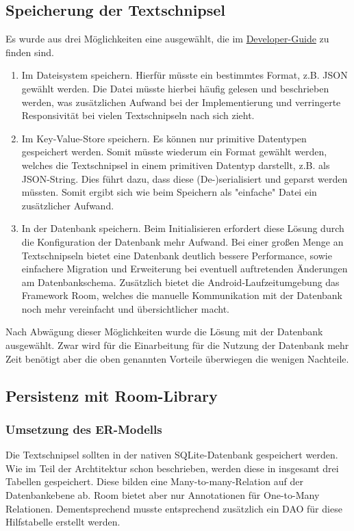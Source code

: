 \documentclass[11pt]{article}
\begin{document}
	\subsection{Speicherung der Textschnipsel}
	Es wurde aus drei Möglichkeiten eine ausgewählt, die im \href{https://developer.android.com/guide/topics/data/data-storage}{Developer-Guide} zu finden sind.
	\begin{enumerate}
		\item Im Dateisystem speichern. Hierfür müsste ein bestimmtes Format, z.B. JSON gewählt werden. Die Datei müsste hierbei häufig gelesen und beschrieben werden, was zusätzlichen Aufwand bei der Implementierung und verringerte Responsivität bei vielen Textschnipseln nach sich zieht.
		\item Im Key-Value-Store speichern. Es können nur primitive Datentypen gespeichert werden. Somit müsste wiederum ein Format gewählt werden, welches die Textschnipsel in einem primitiven Datentyp darstellt, z.B. als JSON-String. Dies führt dazu, dass diese (De-)serialisiert und geparst werden müssten. Somit ergibt sich wie beim Speichern als "einfache" Datei ein zusätzlicher Aufwand.
		\item In der Datenbank speichern. Beim Initialisieren erfordert diese Lösung durch die Konfiguration der Datenbank mehr Aufwand. Bei einer großen Menge an Textschnipseln bietet eine Datenbank deutlich bessere Performance, sowie einfachere Migration und Erweiterung bei eventuell auftretenden Änderungen am Datenbankschema. Zusätzlich bietet die Android-Laufzeitumgebung das Framework Room, welches die manuelle Kommunikation mit der Datenbank noch mehr vereinfacht und übersichtlicher macht.
	\end{enumerate}
	Nach Abwägung dieser Möglichkeiten wurde die Lösung mit der Datenbank ausgewählt. Zwar wird für die Einarbeitung für die Nutzung der Datenbank mehr Zeit benötigt aber die oben genannten Vorteile überwiegen die wenigen Nachteile.
	
	\subsection{Persistenz mit Room-Library}
	\subsubsection{Umsetzung des ER-Modells}
	Die Textschnipsel sollten in der nativen SQLite-Datenbank gespeichert werden. Wie im Teil der Archtitektur schon beschrieben, werden diese in insgesamt drei Tabellen gespeichert. Diese bilden eine Many-to-many-Relation auf der Datenbankebene ab. Room bietet aber nur Annotationen für One-to-Many Relationen. Dementsprechend musste entsprechend zusätzlich ein DAO für diese Hilfstabelle erstellt werden.
	
\end{document}
